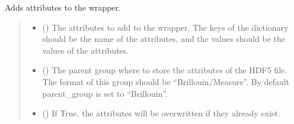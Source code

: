 \documentclass[letterpaper,10pt,english]{sphinxmanual}
\begin{document}
\begin{fulllineitems}
\begin{fulllineitems}
\end{fulllineitems}


\begin{fulllineitems}
\label{\detokenize{_autosummary/HDF5_BLS.wrapper:HDF5_BLS.wrapper.Wrapper.add_attributes}}
\pysigstartsignatures
\pysiglinewithargsret
{}
{\sphinxparamcomma {}\sphinxparamcomma {}}
{}
\pysigstopsignatures
\sphinxAtStartPar
Adds attributes to the wrapper.
\begin{quote}\begin{description}
\begin{itemize}
\item {} 
\sphinxAtStartPar
{} () \textendash{} The attributes to add to the wrapper. The keys of the dictionary should be the name of the attributes, and the values should be the values of the attributes.

\item {} 
\sphinxAtStartPar
{} (\sphinxstyleliteralemphasis{\sphinxupquote{, }}) \textendash{} The parent group where to store the attributes of the HDF5 file. The format of this group should be “Brillouin/Measure”. By default parent\_group is set to “Brillouin”.

\item {} 
\sphinxAtStartPar
{} (\sphinxstyleliteralemphasis{\sphinxupquote{, }}) \textendash{} If True, the attributes will be overwritten if they already exist.

\end{itemize}

\end{description}\end{quote}


\end{fulllineitems}
\end{fulllineitems}
\end{document}
